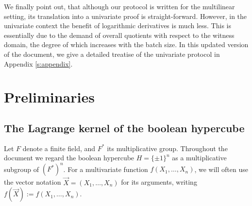 \documentclass[11pt]{article}
\theoremstyle{definition}
\theoremstyle{definition}
\begin{document}
We finally point out, that although our protocol is written for the multilinear setting, its translation into a univariate proof is straight-forward.
However, in the univariate context the benefit of logarithmic derivatives is much less.
This is essentially due to the demand of overall quotients with respect to the witness domain, the degree of which increases with the batch size.
In this updated version of the document, we give a detailed treatise of the univariate protocol in Appendix \ref{s:appendix}.






\section{Preliminaries}
\label{s:preliminaries}

\subsection{The Lagrange kernel of the boolean hypercube}

Let $F$ denote a finite field, and $F^*$ its multiplicative group.
Throughout the document we regard the boolean hypercube $H= \{\pm 1\}^n$  as a multiplicative subgroup of  $(F^*)^n$.
For a multivariate function $f(X_1,\ldots, X_n)$, we will often use the vector notation $\vec X = (X_1,\ldots, X_n)$ for its arguments, writing $f(\vec X) := f(X_1,\ldots, X_n)$.
 
\end{document}
